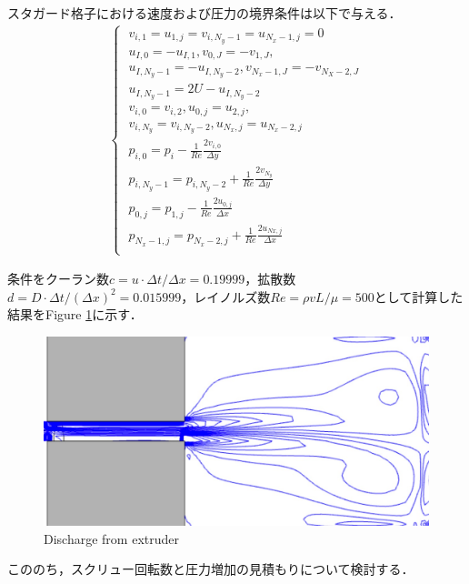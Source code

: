 \documentclass[twocolumn,oneside,a4paper]{article}
\begin{document}
スタガード格子における速度および圧力の境界条件は以下で与える．
\begin{eqnarray}\label{eq:vcondition}
\begin{cases}
\;v_{i,1} = u_{1,j} = v_{i,N_y-1} = u_{N_x-1,j} = 0\nonumber\\
\;u_{I,0} = -u_{I,1}, v_{0,J} = -v_{1,J}, \nonumber\\
\; u_{I,N_y-1} = -u_{I,N_y-2}, v_{N_x-1,J} = -v_{N_X-2,J} \nonumber\\
\; u_{I,N_y-1} = 2U - u_{I,N_y-2} \nonumber\\
\; v_{i,0} = v_{i,2}, u_{0,j} = u_{2,j}, \nonumber\\
\; v_{i,N_y} = v_{i,N_y-2}, u_{N_x,j} = u_{N_x-2,j} \\
\;p_{i,0} = p_i - \frac{1}{Re}\frac{2v_{i,0}}{\Delta y} \nonumber\\
\;p_{i,N_y-1} = p_{i,N_y-2} + \frac{1}{Re}\frac{2v_{N_y}}{\Delta y} \nonumber\\
\;p_{0,j} = p_{1,j} - \frac{1}{Re}\frac{2u_{0,j}}{\Delta x} \nonumber\\
\;p_{N_x-1,j} = p_{N_x-2,j} + \frac{1}{Re}\frac{2u_{Nx,j}}{\Delta x}  \\
\end{cases}  
\end{eqnarray}



条件をクーラン数$c=u \cdot \Delta t / \Delta x=0.19999$，拡散数$d=D \cdot \Delta t/(\Delta x)^2=0.015999$，レイノルズ数$Re=\rho v L / \mu = 500$として計算した結果をFigure \ref{eq:duct_fs}に示す．

\begin{figure}[htbp]
        \includegraphics[bb=0 0 619 304,width=1\columnwidth]{duct_fs.pdf}
    \caption{Discharge from extruder}
   \label{eq:duct_fs}
\end{figure}

こののち，スクリュー回転数と圧力増加の見積もりについて検討する．
\end{document}
